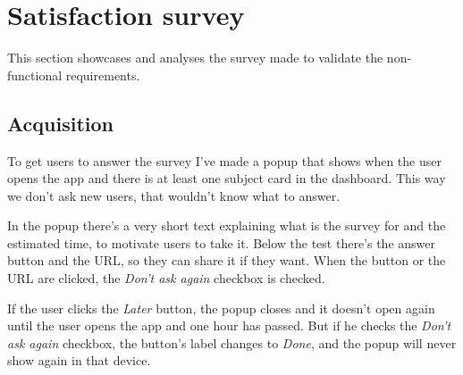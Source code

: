 \clearpage\newpage
\section{Satisfaction survey}
\label{sec:survey}

This section showcases and analyses the survey made to validate the non-functional requirements.

\subsection{Acquisition}

To get users to answer the survey I've made a popup that shows when the user opens the app and there is at least one subject card in the dashboard. This way we don't ask new users, that wouldn't know what to answer.

In the popup there's a very short text explaining what is the survey for and the estimated time, to motivate users to take it. Below the test there's the answer button and the URL, so they can share it if they want. When the button or the URL are clicked, the \textit{Don't ask again} checkbox is checked.

If the user clicks the \textit{Later} button, the popup closes and it doesn't open again until the user opens the app and one hour has passed. But if he checks the \textit{Don't ask again} checkbox, the button's label changes to \textit{Done}, and the popup will never show again in that device.

